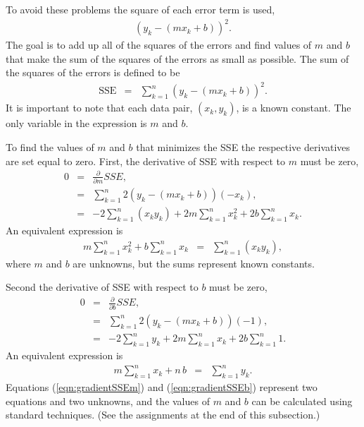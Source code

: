 \documentclass[12pt]{article}
\newcommand{\lp}{\left(}
\newcommand{\rp}{\right)}
\begin{document}
To avoid these problems the square of each error term is used,
\begin{eqnarray*}
  \lp y_k - (m x_k + b) \rp^2.
\end{eqnarray*}
The goal is to add up all of the squares of the errors and find values
of $m$ and $b$ that make the sum of the squares of the errors as small
as possible. The sum of the squares of the errors is defined to be
\begin{eqnarray}
  \label{eqn:sse}
  \mathrm{SSE} & = & \sum_{k=1}^n \lp y_k - (m x_k + b) \rp^2.
\end{eqnarray}
It is important to note that each data pair, $(x_k,y_k)$, is a known
constant. The only variable in the expression is $m$ and $b$. 

To find the values of $m$ and $b$ that minimizes the SSE the
respective derivatives are set equal to zero. First, the derivative of
SSE with respect to $m$ must be zero,
\begin{eqnarray*}
  0 & = & \frac{\partial}{\partial m} SSE, \\
  & = & \sum_{k=1}^n 2\lp y_k - (m x_k + b) \rp (-x_k), \\
  & = & -2 \sum_{k=1}^n (x_k y_k) + 
  2 m \sum_{k=1}^n x_k^2 + 2 b \sum_{k=1}^n x_k.
\end{eqnarray*}
An equivalent expression is
\begin{eqnarray}
  \label{eqn:gradientSSEm}
  m \sum_{k=1}^n x_k^2 + b \sum_{k=1}^n x_k & = & 
  \sum_{k=1}^n (x_k y_k),
\end{eqnarray}
where $m$ and $b$ are unknowns, but the sums represent known
constants.

Second the derivative of SSE with respect to $b$ must be zero,
\begin{eqnarray*}
  0 & = & \frac{\partial}{\partial b} SSE, \\
  & = & \sum_{k=1}^n 2\lp y_k - (m x_k + b) \rp (-1), \\
  & = & -2 \sum_{k=1}^n y_k + 
  2 m \sum_{k=1}^n x_k + 2 b \sum_{k=1}^n 1.
\end{eqnarray*}
An equivalent expression is
\begin{eqnarray}
  \label{eqn:gradientSSEb}
  m \sum_{k=1}^n x_k + n\,b & = & 
  \sum_{k=1}^n y_k.
\end{eqnarray}
Equations (\ref{eqn:gradientSSEm}) and (\ref{eqn:gradientSSEb})
represent two equations and two unknowns, and the values of $m$ and
$b$ can be calculated using standard techniques. (See the assignments
at the end of this subsection.)
\end{document}
